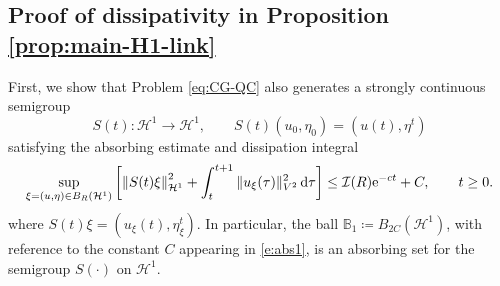 \documentclass[12pt,leqno]{amsart}
\def\e{{\rm e}}
\def\d{{\rm d}}
\theoremstyle{definition}
\numberwithin{equation}{section}
\numberwithin{figure}{section}
\begin{document}
 
 
\subsection{Proof of dissipativity in Proposition \ref{prop:main-H1-link}}
First, we show that Problem \eqref{eq:CG-QC} also generates a  
strongly continuous semigroup
\[
S(t):\mathcal H^{1}\to\mathcal H^{1},\qquad S(t)(u_0,\eta_0)=(u(t),\eta^{t})
\] 
satisfying the absorbing estimate and dissipation integral
\begin{equation} \label{e:abs1}
	\sup_{\xi=(u,\eta) \in B_{R}({\mathcal H^1})} \left[ \left\| S(t) \xi\right\|_{{\mathcal H^1}}^2 + \int_{t}^{t+1} \|u_\xi (\tau)\|_{  {V^2}}^2 \, \d \tau \right] \leq \mathcal I (R)\e^{-ct} +C, \qquad t\geq 0.
\end{equation} 
where $S(t)\xi=(u_\xi(t),\eta_\xi^t)$.
In particular, the ball  $\mathbb B_1\coloneqq B_{2C}({\mathcal H^1})$, with reference to the constant $C$ appearing in  \eqref{e:abs1}, is an absorbing set for the semigroup $S(\cdot)$ on $\mathcal H^1$.
 
\end{document}
